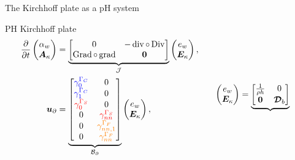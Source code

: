 \documentclass[aspectratio=169]{ISAE-Beamer}
\DeclareMathOperator*{\grad}{grad}
\DeclareMathOperator*{\Grad}{Grad}
\DeclareMathOperator*{\Div}{Div}
\renewcommand{\div}{\operatorname{div}}
\begin{document}
\begin{frame}{The Kirchhoff plate as a pH system}
	\begin{block}{PH Kirchhoff plate}
		\begin{equation*}
		\begin{aligned}
		\displaystyle
		\diffp{}{t}
		\begin{pmatrix}
		\alpha_w \\
		\bm{A}_{\kappa} \\
		\end{pmatrix} &= 
		\underbrace{\begin{bmatrix}
			0  &  - \div \circ \Div \\
			\Grad \circ \grad & \bm{0} \\
			\end{bmatrix}}_{\mathcal{J}}
		\begin{pmatrix}
		e_w \\
		\bm{E}_{\kappa} \\
		\end{pmatrix}, \vspace{3pt}\\
		\bm{u}_\partial &= \underbrace{
			\begin{bmatrix}
			\textcolor{blue}{\gamma_{0}^{\Gamma_C}} & {0}  \\
			\textcolor{blue}{\gamma_1^{\Gamma_C}} &  {0} \\
			\textcolor{red}{\gamma_{0}^{\Gamma_S}} &  {0}  \\
			{0} & \textcolor{red}{\gamma_{nn}^{\Gamma_S}} \\
			{0} & \textcolor{orange}{\gamma_{nn, 1}^{\Gamma_F}}  \\
			{0} & \textcolor{orange}{\gamma_{nn}^{\Gamma_F}}\\
			\end{bmatrix}}_{\mathcal{B}_\partial} \begin{pmatrix}
		e_w \\
		\bm{E}_{\kappa} \\
		\end{pmatrix}, 
		\end{aligned} \qquad
		\begin{aligned}
		\begin{pmatrix}
		e_w \\
		\bm{E}_{\kappa} \\
		\end{pmatrix} &= 
		\underbrace{\begin{bmatrix}
		\frac{1}{\rho h}  &  0 \\
		\bm{0} & \bm{\mathcal{D}}_b \\

\end{bmatrix}}
\end{aligned}
\end{equation*}
\end{block}
\end{frame}
\end{document}

